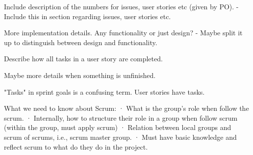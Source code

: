 Include description of the numbers for issues, user stories etc (given by PO). 
- Include this in section regarding issues, user stories etc. 

More implementation details. Any functionality or just design?
- Maybe split it up to distinguish between design and functionality.

Describe how all tasks in a user story are completed.

Maybe more details when something is unfinished.

"Tasks" in sprint goals is a confusing term. User stories have tasks.

What we need to know about Scrum:
· What is the group’s role when follow the scrum.
· Internally, how to structure their role in a group when follow scrum (within the group,  must apply scrum)
· Relation between local groups and scrum of scrums, i.e., scrum master group.
· Must have basic knowledge and reflect scrum to what do they do in the project.

